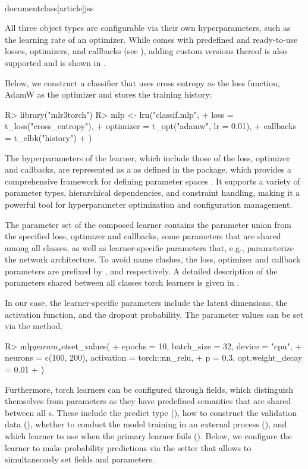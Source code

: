 \\documentclass[article]{jss}
\theoremstyle{definition}
\begin{document}
All three object types are configurable via their own hyperparameters, such as the learning rate of an optimizer.
While  comes with predefined and ready-to-use losses, optimizers, and callbacks (see ), adding custom versions thereof is also supported and is shown in .

Below, we construct a  classifier that uses cross entropy as the loss function, AdamW as the optimizer \citep{ref-loshchilov2017decoupled} and stores the training history:

\begin{CodeInput}
R> library("mlr3torch")
R> mlp <- lrn("classif.mlp",
+   loss = t_loss("cross_entropy"),
+   optimizer = t_opt("adamw", lr = 0.01),
+   callbacks = t_clbk("history")
+ )
\end{CodeInput}

The hyperparameters of the learner, which include those of the loss, optimizer and callbacks, are represented as a  as defined in the  package, which provides a comprehensive framework for defining parameter spaces \citep{ref-paradox2024}.
It supports a variety of parameter types, hierarchical dependencies, and constraint handling, making it a powerful tool for hyperparameter optimization and configuration management.

The parameter set of the composed learner contains the parameter union from the specified loss, optimizer and callbacks, some parameters that are shared among all  classes, as well as learner-specific parameters that, e.g., parameterize the network architecture.
To avoid name clashes, the loss, optimizer and callback parameters are prefixed by ,   and  respectively.
A detailed description of the parameters shared between all classes torch learners is given in .

In our case, the learner-specific parameters include the latent dimensions, the activation function, and the dropout probability.
The parameter values can be set via the  method.

\begin{CodeInput}
R> mlp$param_set$set_values(
+   epochs = 10, batch_size = 32, device = "cpu",
+   neurons = c(100, 200), activation = torch::nn_relu,
+   p = 0.3, opt.weight_decay = 0.01
+ )
\end{CodeInput}

Furthermore, torch learners can be configured through fields, which distinguish themselves from parameters as they have predefined semantics that are shared between all s.
These include the predict type (), how to construct the validation data (), whether to conduct the model training in an external process (), and which learner to use when the primary learner fails ().
Below, we configure the learner to make probability predictions via the setter  that allows to simultaneously set fields and parameters.
\end{document}
